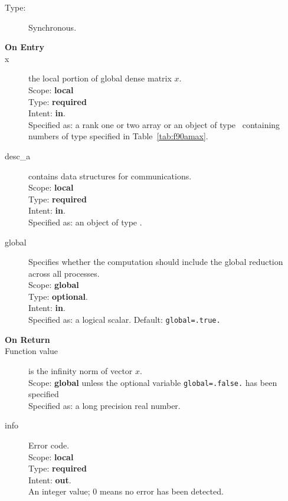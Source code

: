 \begin{description}
\item[Type:] Synchronous.
\item[\bf On Entry]
\item[x] the local portion of global dense matrix
$x$. %
\\
Scope: {\bf local} \\
Type: {\bf required} \\
Intent: {\bf in}.\\
Specified as:  a rank one or two array or an object of type \vdata\  
containing numbers of type specified in
Table~\ref{tab:f90amax}.
\item[desc\_a] contains data structures for communications.\\
Scope: {\bf local} \\
Type: {\bf required}\\
Intent: {\bf in}.\\
Specified as: an object of type \descdata.
\item[global]  Specifies whether the computation should include the
  global reduction across all processes.\\
Scope: {\bf global} \\
Type: {\bf optional}.\\
Intent: {\bf in}.\\
Specified as: a logical scalar.
Default: \verb|global=.true.|\\%

\item[\bf On Return] 
\item[Function value] is the infinity norm of vector $x$.\\
Scope: {\bf global} unless the optional variable
\verb|global=.false.| has been specified\\
Specified as: a long precision real number.
\item[info] Error code.\\
Scope: {\bf local} \\
Type: {\bf required} \\
Intent: {\bf out}.\\
An integer value; 0 means no error has been detected. 
\end{description}

